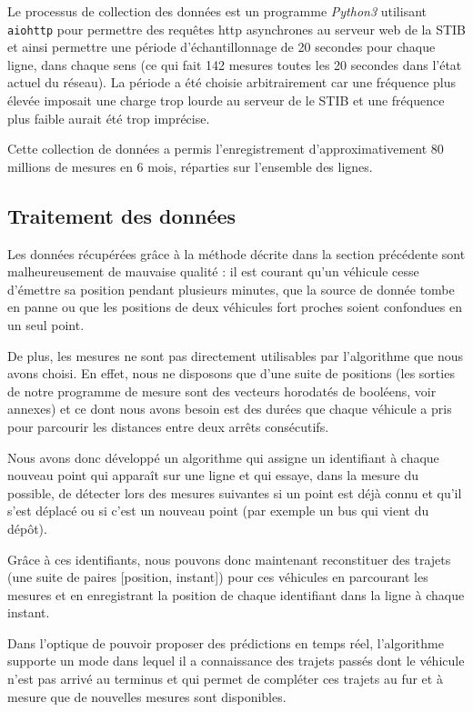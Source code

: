 \documentclass[letterpaper]{article}
\begin{document}
Le processus de collection des données est un programme \textit{Python3} utilisant \texttt{aiohttp} pour permettre des requêtes http asynchrones au serveur web de la STIB et ainsi permettre une période d’échantillonnage de 20 secondes pour chaque ligne, dans chaque sens (ce qui fait 142 mesures toutes les 20 secondes dans l'état actuel du réseau). La période a été choisie arbitrairement car une fréquence plus élevée imposait une charge trop lourde au serveur de le STIB et une fréquence plus faible aurait été trop imprécise.

Cette collection de données a permis l'enregistrement d'approximativement 80 millions de mesures en 6 mois, réparties sur l'ensemble des lignes.


\subsection{Traitement des données}

Les données récupérées grâce à la méthode décrite dans la section précédente sont malheureusement de mauvaise qualité : il est courant qu'un véhicule cesse d’émettre sa position pendant plusieurs minutes, que la source de donnée tombe en panne ou que les positions de deux véhicules fort proches soient confondues en un seul point.

De plus, les mesures ne sont pas directement utilisables par l'algorithme que nous avons choisi. En effet, nous ne disposons que d'une suite de positions (les sorties de notre programme de mesure sont des vecteurs horodatés de booléens, voir annexes) et ce dont nous avons besoin est des durées que chaque véhicule a pris pour parcourir les distances entre deux arrêts consécutifs.

Nous avons donc développé un algorithme qui assigne un identifiant à chaque nouveau point qui apparaît sur une ligne et qui essaye, dans la mesure du possible, de détecter lors des mesures suivantes si un point est déjà connu et qu'il s'est déplacé ou si c'est un nouveau point (par exemple un bus qui vient du dépôt).

Grâce à ces identifiants, nous pouvons donc maintenant reconstituer des trajets (une suite de paires [position, instant]) pour ces véhicules en parcourant les mesures et en enregistrant la position de chaque identifiant dans la ligne à chaque instant.

Dans l'optique de pouvoir proposer des prédictions en temps réel, l'algorithme supporte un mode dans lequel il a connaissance des trajets passés dont le véhicule n'est pas arrivé au terminus et qui permet de compléter ces trajets au fur et à mesure que de nouvelles mesures sont disponibles.
\end{document}
